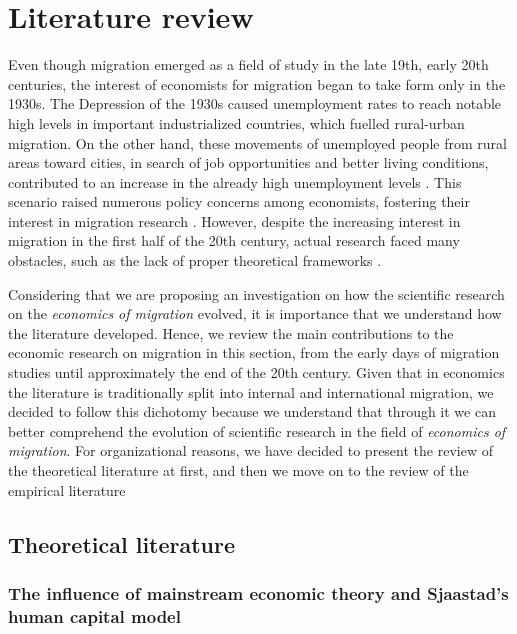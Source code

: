 \section{Literature review} \label{lit_review}

Even though migration emerged as a field of study in the late 19th, early 20th centuries, the interest of economists for migration began to take form only in the 1930s. The Depression of the 1930s caused unemployment rates to reach notable high levels in important industrialized countries, which fuelled rural-urban migration. On the other hand, these movements of unemployed people from rural areas toward cities, in search of job opportunities and better living conditions, contributed to an increase in the already high unemployment levels \citep{greenwood_early_2003}. This scenario raised numerous policy concerns among economists, fostering their interest in migration research \citep{lucas_internal_1997, greenwood_internal_1997, greenwood_early_2003}. However, despite the increasing interest in migration in the first half of the 20th century, actual research faced many obstacles, such as the lack of proper theoretical frameworks \citep{greenwood_early_2003}.

Considering that we are proposing an investigation on how the scientific research on the \textit{economics of migration} evolved, it is importance that we understand how the literature developed. Hence, we review the main contributions to the economic research on migration in this section, from the early days of migration studies until approximately the end of the 20th century.  Given that in economics the literature is traditionally split into internal and international migration, we decided to follow this dichotomy because we understand that through it we can better comprehend the evolution of scientific research in the field of \textit{economics of migration}. For organizational reasons, we have decided to present the review of the theoretical literature at first, and then we move on to the review of the empirical literature

\subsection{Theoretical literature} \label{lit_review_theories}

\subsubsection{The influence of mainstream economic theory and Sjaastad's human capital model}

